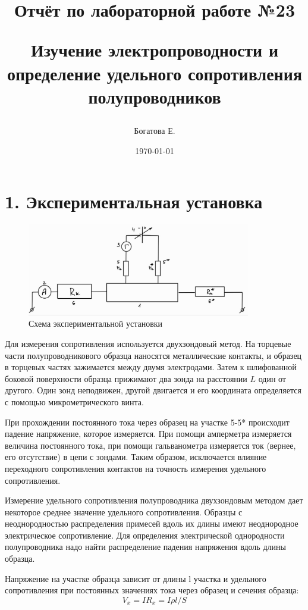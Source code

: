 \documentclass[a4paper,12pt]{report}
\title{Отчёт по лабораторной работе №23

Изучение электропроводности и определение удельного сопротивления полупроводников}
\author{Богатова Е.}
\date{\today}
\begin{document}
\maketitle
\section*{1. Экспериментальная установка}

\begin{figure}[H]
    \centering	
    \includegraphics[width=0.87\textwidth]{ustanovka.jpg}
    \caption{Схема экспериментальной установки}
    \label{ustanovka}
\end{figure}

Для измерения сопротивления используется двухзондовый метод. На торцевые части полупроводникового образца наносятся металлические контакты, и образец в торцевых частях зажимается между двумя электродами. Затем к шлифованной боковой поверхности образца прижимают два зонда на расстоянии $L$ один от другого. Один зонд неподвижен, другой двигается и его координата определяется с помощью микрометрического винта. 

При прохождении постоянного тока через образец на участке 5-5* происходит падение напряжение, которое измеряется. При помощи амперметра измеряется величина постоянного тока, при помощи гальванометра измеряется ток (вернее, его отсутствие) в цепи с зондами. Таким образом, исключается влияние переходного сопротивления контактов на точность измерения удельного сопротивления.

Измерение удельного сопротивления полупроводника двухзондовым методом дает некоторое среднее значение удельного сопротивления. Образцы с неоднородностью распределения примесей вдоль их длины имеют неоднородное электрическое сопротивление. Для определения электрической однородности полупроводника надо найти распределение падения напряжения вдоль длины образца.

Напряжение на участке образца зависит от длины l участка и удельного сопротивления при постоянных значениях тока через образец и сечения образца: 
    \begin{equation}\label{key}
    	V_x=IR_x=I\rho l/S
    \end{equation}
\end{document}
